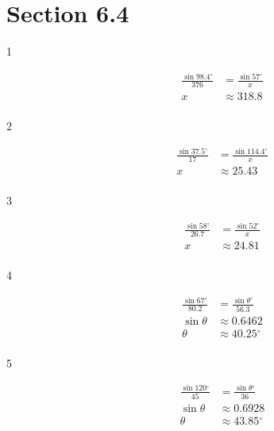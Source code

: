 \documentclass{exam}
\newcommand{\dg}{\ensuremath{^\circ}}
\begin{document}
  \ifprintanswers

    \section{Section 6.4}

    \begin{description}

      \item[1] 
        \begin{align*}
          \frac{\sin 98.4 \dg}{376} & = \frac{\sin 57 \dg}{x} \\
          x                         & \approx \boxed{ 318.8 } \\
        \end{align*}

      \item[2] 
        \begin{align*}
          \frac{\sin 37.5 \dg}{17} & = \frac{\sin 114.4 \dg}{x} \\
          x                        & \approx \boxed{ 25.43 } \\
        \end{align*}

      \item[3] 
        \begin{align*}
          \frac{\sin 58 \dg}{26.7} & = \frac{\sin 52 \dg}{x} \\
          x                         & \approx \boxed{ 24.81 } \\
        \end{align*}

      \item[4] 
        \begin{align*}
          \frac{\sin 67 \dg}{80.2} & = \frac{\sin \theta \dg}{56.3} \\
          \sin \theta              & \approx 0.6462 \\
          \theta                   & \approx \boxed{ 40.25 \dg } \\
        \end{align*}

      \item[5] 
        \begin{align*}
          \frac{\sin 120 \dg}{45} & = \frac{\sin \theta \dg}{36} \\
          \sin \theta             & \approx 0.6928 \\
          \theta                  & \approx \boxed{ 43.85 \dg } \\
        \end{align*}


\end{description}
\end{document}
